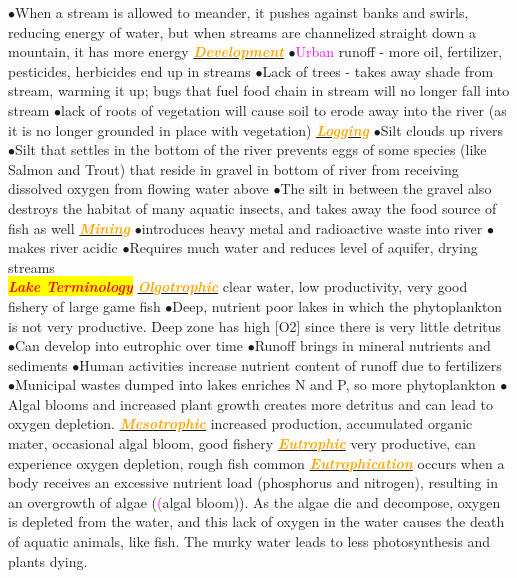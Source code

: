 \documentclass{article}
\newcommand{\ddd}{$\bullet$}
\newcommand{\red}[1]{\textcolor{red}{#1}}
\newcommand{\pink}[1]{\textcolor{magenta}{#1}}
\newcommand{\orange}[1]{\textcolor{orange}{#1}}
\newcommand{\mysection}[1]{\colorbox{yellow}{\textbf{\textit{\red{#1}}}}}
\newcommand{\mysubsection}[1]{\underline{\textbf{{\textit{\orange{#1}}}}}}
\newcommand{\vocab}[1]{{\pink{#1}}}
\begin{document}
\begin{multicols*}{4}
                \ddd When a stream is allowed to meander, it pushes against banks and swirls, reducing energy of water, but when streams are channelized straight down a mountain, it has more energy
        \mysubsection{Development}
            \ddd \vocab{Urban} runoff - more oil, fertilizer, pesticides, herbicides end up in streams
            \ddd Lack of trees - takes away shade from stream, warming it up; bugs that fuel food chain in stream will no longer fall into stream
            \ddd lack of roots of vegetation will cause soil to erode away into the river (as it is no longer grounded in place with vegetation) 
        \mysubsection{Logging}
            \ddd Silt clouds up rivers
            \ddd Silt that settles in the bottom of the river prevents eggs of some species (like Salmon and Trout) that reside in gravel in bottom of river from receiving dissolved oxygen from flowing water above
            \ddd The silt in between the gravel also destroys the habitat of many aquatic insects, and takes away the food source of fish as well
        \mysubsection{Mining}
            \ddd introduces heavy metal and radioactive waste into river
            \ddd makes river acidic
            \ddd Requires much water and reduces level of aquifer, drying streams
    \\
    \mysection{Lake Terminology}
        \mysubsection{Olgotrophic} clear water, low productivity, very good fishery of large game fish
            \ddd Deep, nutrient poor lakes in which the phytoplankton is not very productive. Deep zone has high [O2] since there is very little detritus
            \ddd Can develop into eutrophic over time
            \ddd Runoff brings in mineral nutrients and sediments
            \ddd Human activities increase nutrient content of runoff due to fertilizers
            \ddd Municipal wastes dumped into lakes enriches N and P, so more phytoplankton
            \ddd Algal blooms and increased plant growth creates more detritus and can lead to oxygen depletion.
        \mysubsection{Mesotrophic} increased production, accumulated organic mater, occasional algal bloom, good fishery
        \mysubsection{Eutrophic} very productive, can experience oxygen depletion, rough fish common
        \mysubsection{Eutrophication} occurs when a body receives an excessive nutrient load (phosphorus and nitrogen), resulting in an overgrowth of algae (\pink(algal bloom)). As the algae die and decompose, oxygen is depleted from the water, and this lack of oxygen in the water causes the death of aquatic animals, like fish. The murky water leads to less photosynthesis and plants dying. 

\end{multicols*}
\end{document}
